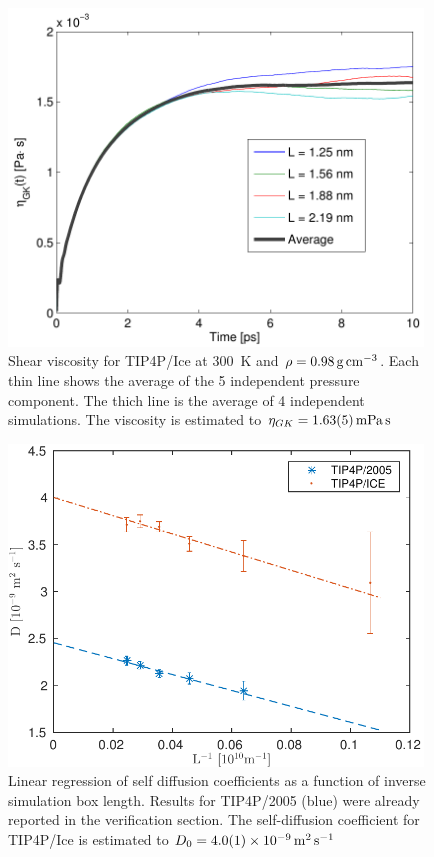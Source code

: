 \begin{figure}
\centering
\includegraphics[width=11cm]{../figures/thesis/viscosity_green_kubo_tip4p_ice.pdf}
\caption{Shear viscosity for TIP4P/Ice at \SI{300}{\kelvin} and $\rho = \text{\SI{0.98}{\gram\per\cubic\cm}}$. Each thin line shows the average of the 5 independent pressure component. The thich line is the average of 4 independent simulations. The viscosity is estimated to $\eta_{GK} = \text{\SI{1.63\pm0.05}{\milli\pascal\second}}$}
\label{fig:viscosity_green_kubo_tip4p_ice}
\end{figure}

\begin{figure}
\centering
\includegraphics[width=11cm]{../figures/thesis/diffusivity_comparison_tip4p_ice_2005.pdf}
\caption{Linear regression of self diffusion coefficients as a function of inverse simulation box length. Results for TIP4P/2005 (blue) were already reported in the verification section. The self-diffusion coefficient for TIP4P/Ice is estimated to $D_0 = \SI{4.0 \pm 0.1 d-9}{\meter\squared\per\second}$}
\label{fig:diffusivity_comparison_tip4p_ice_2005}
\end{figure}

